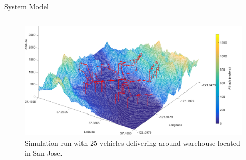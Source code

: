 \documentclass[final]{beamer}
\newlength{\onecolwid}
\newlength{\twocolwid}
\begin{document}
\begin{frame}[t]
\begin{columns}[t]
\begin{column}{\twocolwid}
\begin{columns}[t,totalwidth=\twocolwid]
\begin{column}{\onecolwid}
\begin{block}{System Model}

{\small\par}

\end{block}


%
%
%
%
%


\end{column} %

\end{columns} %



{\small\par}

\begin{figure}
\includegraphics[width=1\linewidth]{images/poster_terrain.png}
\caption{Simulation run with 25 vehicles delivering around warehouse located in San Jose.}
\end{figure}


\end{column}
\end{columns}
\end{frame}
\end{document}
